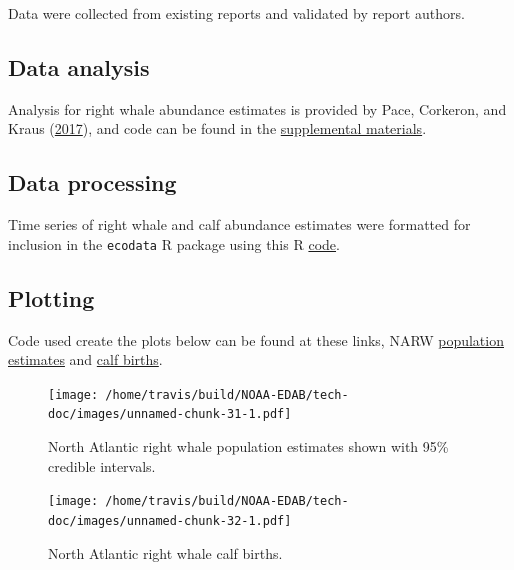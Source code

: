 \documentclass[
]{book}
\begin{document}
Data were collected from existing reports and validated by report authors.

\hypertarget{data-analysis-29}{%
\subsection{Data analysis}\label{data-analysis-29}}

Analysis for right whale abundance estimates is provided by Pace, Corkeron, and Kraus (\protect\hyperlink{ref-Pace2017}{2017}), and code can be found in the \href{https://onlinelibrary.wiley.com/action/downloadSupplement?doi=10.1002\%2Fece3.3406\&file=ece33406-sup-0001-SupInfo.docx}{supplemental materials}.

\hypertarget{data-processing-21}{%
\subsection{Data processing}\label{data-processing-21}}

Time series of right whale and calf abundance estimates were formatted for inclusion in the \texttt{ecodata} R package using this R \href{https://github.com/NOAA-EDAB/ecodata/blob/master/data-raw/get_narw.R}{code}.

\hypertarget{plotting-23}{%
\subsection{Plotting}\label{plotting-23}}

Code used create the plots below can be found at these links, NARW \href{https://github.com/NOAA-EDAB/ecodata/blob/master/chunk-scripts/macrofauna.Rmd-NARW-abundance.R}{population estimates} and \href{https://github.com/NOAA-EDAB/ecodata/blob/master/chunk-scripts/macrofauna.Rmd-NARW-calf-abundance.R}{calf births}.

\begin{figure}
\centering
\texttt{[image: /home/travis/build/NOAA-EDAB/tech-doc/images/unnamed-chunk-31-1.pdf]}
\caption{\label{fig:unnamed-chunk-31}North Atlantic right whale population estimates shown with 95\% credible intervals.}
\end{figure}

\begin{figure}
\centering
\texttt{[image: /home/travis/build/NOAA-EDAB/tech-doc/images/unnamed-chunk-32-1.pdf]}
\caption{\label{fig:unnamed-chunk-32}North Atlantic right whale calf births.}
\end{figure}
\end{document}
